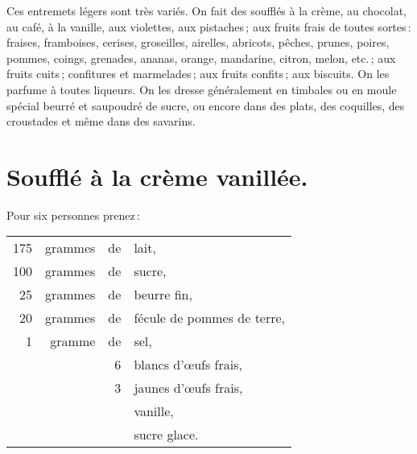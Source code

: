 Ces entremets légers sont très variés. On fait des soufflés à la crème, au
chocolat, au café, à la vanille, aux violettes, aux pistaches ; aux fruits
frais de toutes sortes : fraises, framboises, cerises, groseilles, airelles,
abricots, pêches, prunes, poires, pommes, coings, grenades, ananas, orange,
mandarine, citron, melon, etc. ; aux fruits cuits ; confitures et marmelades ;
aux fruits confits ; aux biscuits. On les parfume à toutes liqueurs. On les
dresse généralement en timbales ou en moule spécial beurré et saupoudré de
sucre, ou encore dans des plats, des coquilles, des croustades et même dans des
savarins.

\section*{\centering Soufflé à la crème vanillée.}
{}

Pour six personnes prenez :

\footnotesize
\begin{longtable}{rrrp{16em}}
   175 & grammes & de & lait,                                                                             \\
   100 & grammes & de & sucre,                                                                            \\
    25 & grammes & de & beurre fin,                                                                       \\
    20 & grammes & de & fécule de pommes de terre,                                                        \\
     1 & gramme  & de & sel,                                                                              \\
       &         &  6 & blancs d'œufs frais,                                                              \\
       &         &  3 & jaunes d'œufs frais,                                                              \\
       &         &    & vanille,                                                                          \\
       &         &    & sucre glace.                                                                      \\
\end{longtable}
\normalsize

